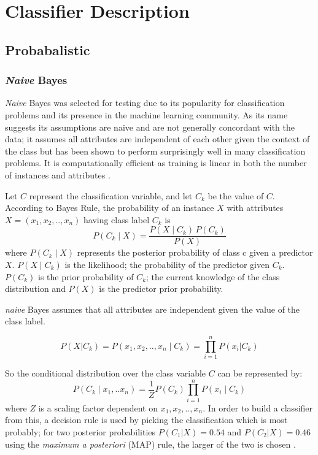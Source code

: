 \documentclass{cmppgr}
\begin{document}
\section{Classifier Description}
\subsection{Probabalistic}
\subsubsection{\textit{Naive} Bayes}
\textit{Naive} Bayes was selected for testing due to its popularity for classification problems and its presence in the machine learning community. As its name suggests its assumptions are naive and are not generally concordant with the data; it assumes all attributes are independent of each other given the context of the class but has been shown to perform surprisingly well in many classification problems. It is computationally efficient as training is linear in both the number of instances and attributes \cite{frank2002locally}. 

Let $C$ represent the classification variable, and let $C_k$ be the value of $C$.
According to Bayes Rule, the probability of an instance $X$ with attributes $X = (x_1, x_2,.. , x_n)$
having class label $C_k$ is
$$ P(C_k \mid X) = \frac{P(X \mid C_k) \, P(C_k)}{P(X)} $$
where $P(C_k \mid X)$ represents the posterior probability of class c given a predictor $X$. $P(X\mid C_k)$ is the likelihood; the probability of the predictor given $C_k$. $P(C_k)$ is the prior probability of $C_k$; the current knowledge of the class distribution and $P(X)$ is the predictor prior probability.

\textit{naive} Bayes assumes that all attributes are independent given the value of the class label.

$$P(X|C_k)=P(x_1, x_2,.. , x_n \mid C_k) = \prod_{i=1}^{n}P(x_i|C_k) $$

So the conditional distribution over the class variable $C$ can be represented by:
$$P(C_k \mid x_1,.. x_n) = \frac{1}{Z}P(C_k)\prod_{i=1}^{n}P(x_i \mid C_k)$$
where $Z$ is a scaling factor dependent on $x_1, x_2,.. , x_n $. In order to build a classifier from this, a decision rule is used by picking the classification which is most probably; for two posterior probabilities $P(C_1|X)= 0.54$ and $P(C_2|X) =0.46$ using the \textit{maximum a posteriori} (MAP) rule, the larger of the two is chosen \cite{zhang2004optimality}.
\end{document}
